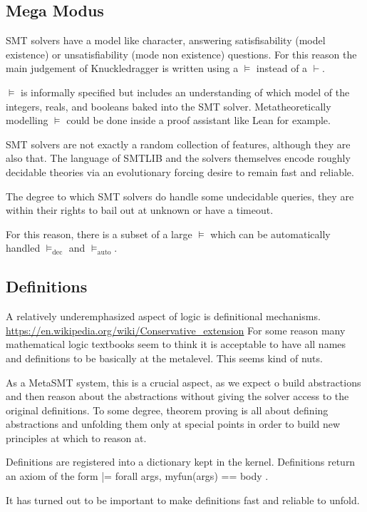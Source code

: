 \documentclass{article}%
\begin{document}
\subsection{Mega Modus}
SMT solvers have a model like character, answering satisfisability (model existence) or unsatisfiability (mode non existence) questions. For this reason the main judgement of Knuckledragger is written using a $\models$ instead of a $\vdash$.

$\models$ is informally specified but includes an understanding of which model of the integers, reals, and booleans baked into the SMT solver. Metatheoretically modelling $\models$ could be done inside a proof assistant like Lean for example.

SMT solvers are not exactly a random collection of features, although they are also that. The language of SMTLIB and the solvers themselves encode roughly decidable theories via an evolutionary forcing desire to remain fast and reliable.

The degree to which SMT solvers do handle some undecidable queries, they are within their rights to bail out at unknown or have a timeout.

For this reason, there is a subset of a large $\models$ which can be automatically handled $\models_{\text{dec}}$ and $\models_{\text{auto}}$.




\subsection{Definitions}

A relatively underemphasized aspect of logic is definitional mechanisms. \url{https://en.wikipedia.org/wiki/Conservative_extension} For some reason many mathematical logic textbooks seem to think it is acceptable to have all names and definitions to be basically at the metalevel. This seems kind of nuts.

As a MetaSMT system, this is a crucial aspect, as we expect o build abstractions and then reason about the abstractions without giving the solver access to the original definitions. To some degree, theorem proving is all about defining abstractions and unfolding them only at special points in order to build new principles at which to reason at.

Definitions are registered into a dictionary kept in the kernel. Definitions return an axiom of the form |= forall args, myfun(args) == body .

It has turned out to be important to make definitions fast and reliable to unfold.
\end{document}
